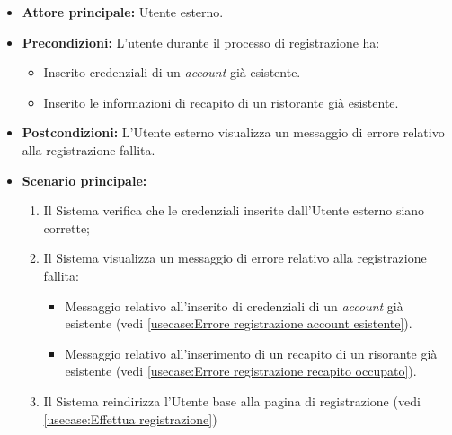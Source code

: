 \label{usecase:Registrazione fallita}

\begin{itemize}
	\item \textbf{Attore principale:} Utente esterno.
	\item \textbf{Precondizioni:}
    L'utente durante il processo di registrazione ha:
    \begin{itemize}
        \item Inserito credenziali di un \textit{account} già esistente.
        \item Inserito le informazioni di recapito di un ristorante già esistente.
    \end{itemize}
	\item \textbf{Postcondizioni:} L'Utente esterno visualizza un messaggio di errore relativo alla registrazione fallita.

	\item \textbf{Scenario principale:}
	\begin{enumerate}
        \item Il Sistema verifica che le credenziali inserite dall'Utente esterno siano corrette;
        \item Il Sistema visualizza un messaggio di errore relativo alla registrazione fallita:
            \begin{itemize}
                \item Messaggio relativo all'inserito di credenziali di un \textit{account} già esistente (vedi \autoref{usecase:Errore registrazione account esistente}).
                \item Messaggio relativo all'inserimento di un recapito  di un risorante già esistente (vedi \autoref{usecase:Errore registrazione recapito occupato}).
            \end{itemize}
        \item Il Sistema reindirizza l'Utente base alla pagina di registrazione (vedi \autoref{usecase:Effettua registrazione})
    \end{enumerate}
	
\end{itemize}


